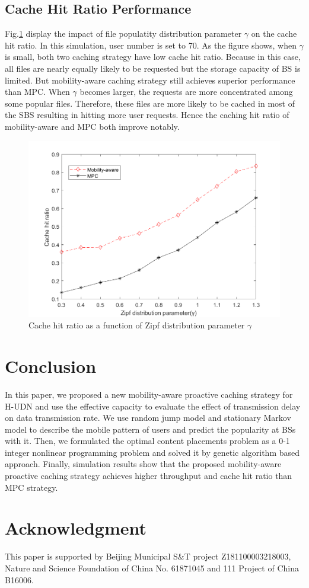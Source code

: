 \documentclass[conference]{IEEEtran}
\begin{document}
\subsection{Cache Hit Ratio Performance}
Fig.\ref{fig 5} display the impact of file populatity distribution parameter $\gamma$ on the cache hit ratio. In this simulation, user number is set to 70. As the figure shows, when $\gamma$is small, both two caching strategy have low cache hit ratio. Because in this case, all files are nearly equally likely to be requested but the storage capacity of BS is limited. But mobility-aware caching strategy still achieves superior performance than MPC. When $\gamma$ becomes larger, the requests are more concentrated among some popular files. Therefore, these files are more likely to be cached in most of the SBS resulting in hitting more user requests. Hence the caching hit ratio of mobility-aware and MPC both improve notably.
\begin{figure}[htbp]
 \centerline{\includegraphics[scale=0.3]{fig5.png}}
 \caption{Cache hit ratio as a function of Zipf distribution parameter $\gamma$ }
 \label{fig 5}
\end{figure}
\section{Conclusion}

In this paper, we proposed a new mobility-aware proactive caching strategy for H-UDN and use the effective capacity to evaluate the effect of transmission delay on data transmission rate. We use random jump model and stationary Markov model to describe the mobile pattern of users and predict the popularity at BSs with it. Then, we formulated the optimal content placements problem as a 0-1 integer nonlinear programming problem and solved it by genetic algorithm based approach. Finally, simulation results show that the proposed mobility-aware proactive caching strategy achieves higher throughput and cache hit ratio than MPC strategy.

\section*{Acknowledgment}

This paper is supported by Beijing Municipal S\&T project Z181100003218003, Nature and Science Foundation of China No. 61871045 and 111 Project of China B16006.



\end{document}
